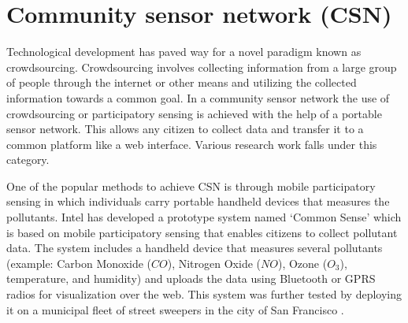 \section{Community sensor network (CSN)}



Technological development has paved way for a novel paradigm known as crowdsourcing. Crowdsourcing involves collecting information from a large group of people through the internet or other means and utilizing the collected information towards a common goal. In a community sensor network the use of crowdsourcing or participatory sensing is achieved with the help of a portable sensor network. This allows any citizen to collect data and transfer it to a common platform like a web interface. Various research work falls under this category.
 


 \par
One of the popular methods to achieve CSN is through mobile participatory sensing in which individuals carry portable handheld devices that measures the pollutants. Intel has developed a prototype system named \lq{Common Sense}\rq \cite{Dutta2009} which is based on mobile participatory sensing that enables citizens to collect pollutant data. The system includes a handheld device that measures several pollutants (example: Carbon Monoxide ($CO$), Nitrogen Oxide ($NO$), Ozone ($O_{3}$), temperature, and humidity) and uploads the data using Bluetooth or GPRS radios for visualization over the web. This system was further tested by deploying it on a municipal fleet of street sweepers in the city of San Francisco \cite{Aoki2008}. 

